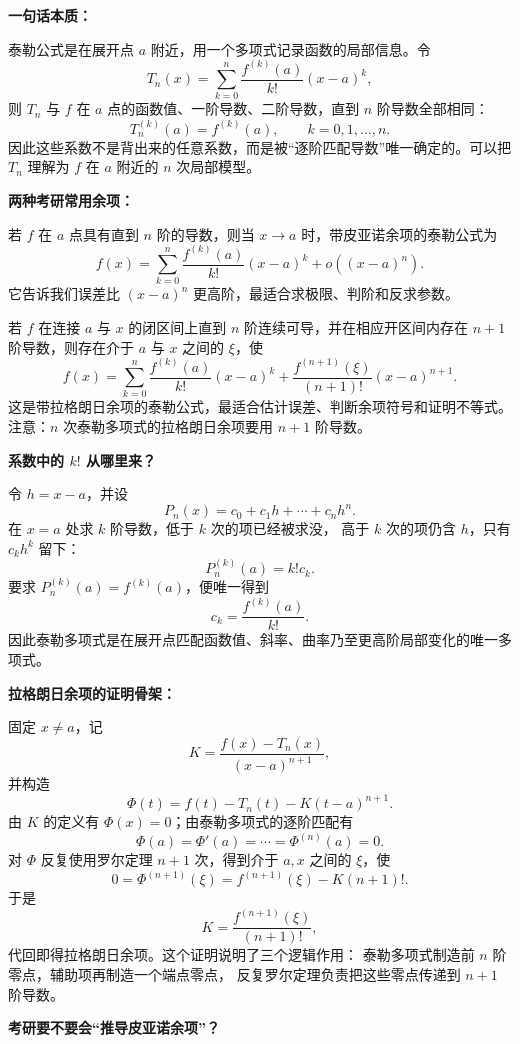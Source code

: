 \begin{knowledgeBox}
\textbf{一句话本质：}

泰勒公式是在展开点 \(a\) 附近，用一个多项式记录函数的局部信息。令
\[
T_n(x)=\sum_{k=0}^{n}\frac{f^{(k)}(a)}{k!}(x-a)^k,
\]
则 \(T_n\) 与 \(f\) 在 \(a\) 点的函数值、一阶导数、二阶导数，直到 \(n\) 阶导数全部相同：
\[
T_n^{(k)}(a)=f^{(k)}(a),\qquad k=0,1,\ldots,n.
\]
因此这些系数不是背出来的任意系数，而是被“逐阶匹配导数”唯一确定的。可以把 \(T_n\) 理解为 \(f\) 在 \(a\) 附近的 \(n\) 次局部模型。

\textbf{两种考研常用余项：}

若 \(f\) 在 \(a\) 点具有直到 \(n\) 阶的导数，则当 \(x\to a\) 时，带皮亚诺余项的泰勒公式为
\[
f(x)=\sum_{k=0}^{n}\frac{f^{(k)}(a)}{k!}(x-a)^k
+o\!\left((x-a)^n\right).
\]
它告诉我们误差比 \((x-a)^n\) 更高阶，最适合求极限、判阶和反求参数。

若 \(f\) 在连接 \(a\) 与 \(x\) 的闭区间上直到 \(n\) 阶连续可导，并在相应开区间内存在 \(n+1\) 阶导数，则存在介于 \(a\) 与 \(x\) 之间的 \(\xi\)，使
\[
f(x)=\sum_{k=0}^{n}\frac{f^{(k)}(a)}{k!}(x-a)^k
+\frac{f^{(n+1)}(\xi)}{(n+1)!}(x-a)^{n+1}.
\]
这是带拉格朗日余项的泰勒公式，最适合估计误差、判断余项符号和证明不等式。注意：\(n\) 次泰勒多项式的拉格朗日余项要用 \(n+1\) 阶导数。

\textbf{系数中的 \(k!\) 从哪里来？}

令 \(h=x-a\)，并设
\[
P_n(x)=c_0+c_1h+\cdots+c_nh^n.
\]
在 \(x=a\) 处求 \(k\) 阶导数，低于 \(k\) 次的项已经被求没，
高于 \(k\) 次的项仍含 \(h\)，只有 \(c_kh^k\) 留下：
\[
P_n^{(k)}(a)=k!c_k.
\]
要求 \(P_n^{(k)}(a)=f^{(k)}(a)\)，便唯一得到
\[
c_k=\frac{f^{(k)}(a)}{k!}.
\]
因此泰勒多项式是在展开点匹配函数值、斜率、曲率乃至更高阶局部变化的唯一多项式。

\textbf{拉格朗日余项的证明骨架：}

固定 \(x\ne a\)，记
\[
K=\frac{f(x)-T_n(x)}{(x-a)^{n+1}},
\]
并构造
\[
\Phi(t)=f(t)-T_n(t)-K(t-a)^{n+1}.
\]
由 \(K\) 的定义有 \(\Phi(x)=0\)；由泰勒多项式的逐阶匹配有
\[
\Phi(a)=\Phi'(a)=\cdots=\Phi^{(n)}(a)=0.
\]
对 \(\Phi\) 反复使用罗尔定理 \(n+1\) 次，得到介于 \(a,x\) 之间的
\(\xi\)，使
\[
0=\Phi^{(n+1)}(\xi)
=f^{(n+1)}(\xi)-K(n+1)!.
\]
于是
\[
K=\frac{f^{(n+1)}(\xi)}{(n+1)!},
\]
代回即得拉格朗日余项。这个证明说明了三个逻辑作用：
泰勒多项式制造前 \(n\) 阶零点，辅助项再制造一个端点零点，
反复罗尔定理负责把这些零点传递到 \(n+1\) 阶导数。

\textbf{考研要不要会“推导皮亚诺余项”？}


\end{knowledgeBox}
